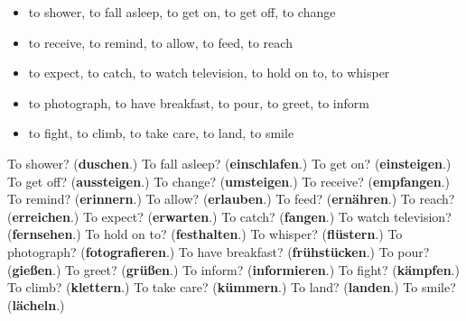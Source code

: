 \begin{itemize}
\raggedright
  \item to shower, to fall asleep, to get on, to get off, to change
  \item to receive, to remind, to allow, to feed, to reach
  \item to expect, to catch, to watch television, to hold on to, to whisper
  \item to photograph, to have breakfast, to pour, to greet, to inform
  \item to fight, to climb, to take care, to land, to smile
\end{itemize}

\begin{tcolorbox}[breakable,colback=teal!4,colframe=teal!35!black,title={Before you move on}]
To shower? (\textbf{duschen}.) To fall asleep? (\textbf{einschlafen}.) To get on? (\textbf{einsteigen}.) To get off? (\textbf{aussteigen}.) To change? (\textbf{umsteigen}.) To receive? (\textbf{empfangen}.) To remind? (\textbf{erinnern}.) To allow? (\textbf{erlauben}.) To feed? (\textbf{ernähren}.) To reach? (\textbf{erreichen}.) To expect? (\textbf{erwarten}.) To catch? (\textbf{fangen}.) To watch television? (\textbf{fernsehen}.) To hold on to? (\textbf{festhalten}.) To whisper? (\textbf{flüstern}.) To photograph? (\textbf{fotografieren}.) To have breakfast? (\textbf{frühstücken}.) To pour? (\textbf{gießen}.) To greet? (\textbf{grüßen}.) To inform? (\textbf{informieren}.) To fight? (\textbf{kämpfen}.) To climb? (\textbf{klettern}.) To take care? (\textbf{kümmern}.) To land? (\textbf{landen}.) To smile? (\textbf{lächeln}.)
\end{tcolorbox}
